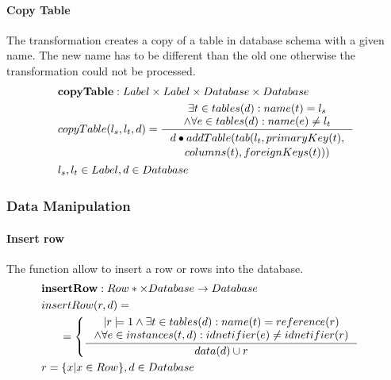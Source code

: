 \documentclass[11pt]{article}
\begin{document}
\paragraph{Copy Table} The transformation creates a copy of a table in database schema with a given name. The new name has to be different than the old one otherwise the transformation could not be processed.
\begin{align*}
&	\mathbf{copyTable} : Label \times Label \times Database \times Database \\
&	copyTable(l_s, l_t, d) = \inference{\exists t \in tables(d) : name(t) = l_s \\ \wedge \forall e \in tables(d) : name(e) \neq l_t}{\begin{gathered} d \bullet addTable(tab(l_t, primaryKey(t), \\ 
 columns(t), foreignKeys(t)))
\end{gathered}}\\
& l_s, l_t \in Label,  d \in Database
\end{align*}


\subsubsection{Data Manipulation}
\paragraph{Insert row} The function allow to insert a row or rows into the database.
\begin{align*}
&	\mathbf{insertRow} : Row* \times Database \rightarrow Database \\
&	insertRow(r, d) = \\
& \;\;\;\;\;\; =\begin{cases}
		 	\inference{|r|=1 \wedge \exists t \in tables(d) : name(t) = reference(r) \\ \wedge \forall e \in instances(t, d) : idnetifier(e) \neq idnetifier(r)}{data(d) \cup r} 
		 \end{cases}	\\
&		 r = \{ x | x \in Row\},d \in Database
\end{align*}
\end{document}
